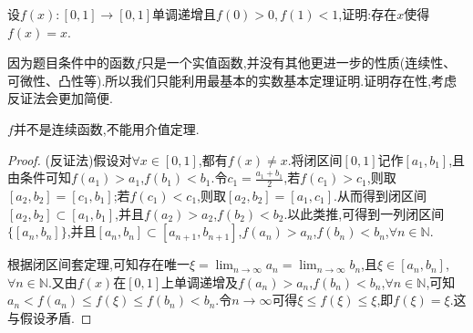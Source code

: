 \documentclass[../../main.tex]{subfiles}%
\begin{document}
\begin{example}
设\(f(x):[0,1]\to[0,1]\)单调递增且\(f(0)>0,f(1)<1\),证明:存在\(x\)使得\(f(x)=x\).
\end{example}
\begin{note}
因为题目条件中的函数$f$只是一个实值函数,并没有其他更进一步的性质(连续性、可微性、凸性等).所以我们只能利用最基本的实数基本定理证明.证明存在性,考虑反证法会更加简便.
\end{note}
\begin{remark}
$f$并不是连续函数,不能用介值定理.
\end{remark}
\begin{proof}

(反证法)假设对$\forall x\in[0,1]$,都有$f(x)\ne x$.将闭区间\([0,1]\)记作\([a_1,b_1]\),且由条件可知\(f(a_1)>a_1\),\(f(b_1)<b_1\).令\(c_1=\frac{a_1 + b_1}{2}\),若\(f(c_1)>c_1\),则取\([a_2,b_2]=[c_1,b_1]\);若\(f(c_1)<c_1\),则取\([a_2,b_2]=[a_1,c_1]\).从而得到闭区间\([a_2,b_2]\subset [a_1,b_1]\),并且\(f(a_2)>a_2\),\(f(b_2)<b_2\).以此类推,可得到一列闭区间\(\{[a_n,b_n]\}\),并且\([a_n,b_n]\subset [a_{n + 1},b_{n + 1}]\),\(f(a_n)>a_n\),\(f(b_n)<b_n\),\(\forall n\in\mathbb{N}\).

根据闭区间套定理,可知存在唯一\(\xi=\lim_{n\rightarrow\infty}a_n=\lim_{n\rightarrow\infty}b_n\),且\(\xi\in [a_n,b_n]\),\(\forall n\in\mathbb{N}\).又由\(f(x)\)在\([0,1]\)上单调递增及\(f(a_n)>a_n\),\(f(b_n)<b_n\),\(\forall n\in\mathbb{N}\),可知\(a_n<f(a_n)\leqslant f(\xi)\leqslant f(b_n)<b_n\).令\(n\rightarrow\infty\)可得\(\xi\leqslant f(\xi)\leqslant\xi\),即\(f(\xi)=\xi\).这与假设矛盾.

\end{proof}
\end{document}
